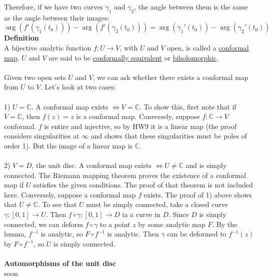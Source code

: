 \documentclass[12 pt]{article}
\begin{document}
Therefore, if we have two curves $\gamma_1$ and $\gamma_2$, the angle between them is the same as the angle between their images:
\[ \arg\left( f'(\gamma_1 (t_0)) \right) - \arg\left( f'(\gamma_2 (t_0)) \right) = \arg(\gamma_1 '(t_0)) - \arg(\gamma_2 '(t_0))\]
\textbf{Definition}
\\
A bijective analytic function $f:U\to V$, with $U$ and $V$ open, is called a \underline{conformal map}. $U$ and $V$ are said to be \underline{conformally equivalent} or \underline{biholomorphic}.
\\
\\
Given two open sets $U$ and $V$, we can ask whether there exists a conformal map from $U$ to $V$. Let's look at two cases:
\\
\\
1) $U = \mathbb{C}$. A conformal map exists $\Leftrightarrow V=\mathbb{C}$. To show this, first note that if $V=\mathbb{C}$, then $f(z) = z$ is a conformal map. Conversely, suppose $f:\mathbb{C}\to V$ conformal. $f$ is entire and injective, so by HW9 it is a linear map (the proof considers singularities at $\infty$ and shows that these singularities must be poles of order 1). But the image of a linear map is $\mathbb{C}$. 
\\
\\
2) $V=D$, the unit disc. A conformal map exists $\Leftrightarrow U\neq \mathbb{C}$ and is simply connected. The Riemann mapping theorem proves the existence of a conformal map if $U$ satisfies the given conditions. The proof of that theorem is not included here. Conversely, suppose a conformal map $f$ exists. The proof of 1) above shows that $U\neq \mathbb{C}$. To see that $U$ must be simply connected, take a closed curve $\gamma :[0,1]\to U$. Then $f\circ \gamma : [0,1]\to D$ ia a curve in $D$. Since $D$ is simply connected, we can deform $f\circ \gamma$ to a point $z$ by some analytic map $F$. By the lemma, $f^{-1}$ is analytic, so $F \circ f^{-1}$ is analytic. Then $\gamma$ can be deformed to $f^{-1}(z)$ by $F \circ f^{-1}$, so $U$ is simply connected.
\\
\\
\textbf{Automorphisms of the unit disc}
\\
soon
\end{document}
